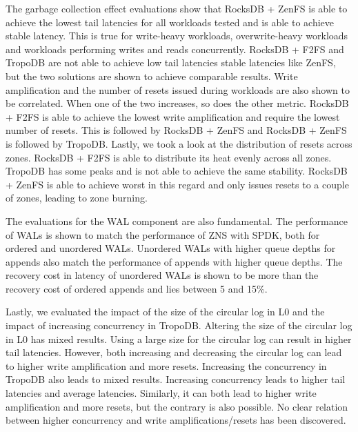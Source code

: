 The garbage collection effect evaluations show that RocksDB + ZenFS is able to achieve the lowest tail latencies for all workloads tested and is able to achieve stable latency. This is true for write-heavy workloads, overwrite-heavy workloads and workloads performing writes and reads concurrently. RocksDB + F2FS and TropoDB are not able to achieve low tail latencies stable latencies like ZenFS, but the two solutions are shown to achieve comparable results. Write amplification and the number of resets issued during workloads are also shown to be correlated. When one of the two increases, so does the other metric. RocksDB + F2FS is able to achieve the lowest write amplification and require the lowest number of resets. This is followed by RocksDB + ZenFS and RocksDB + ZenFS is followed by TropoDB. Lastly, we took a look at the distribution of resets across zones. RocksDB + F2FS is able to distribute its heat evenly across all zones. TropoDB has some peaks and is not able to achieve the same stability. RocksDB + ZenFS is able to achieve worst in this regard and only issues resets to a couple of zones, leading to zone burning.

The evaluations for the WAL component are also fundamental. The performance of WALs is shown to match the performance of ZNS with SPDK, both for ordered and unordered WALs. Unordered WALs with higher queue depths for appends also match the performance of appends with higher queue depths. The recovery cost in latency of unordered WALs is shown to be more than the recovery cost of ordered appends and lies between 5 and 15\%.  

Lastly, we evaluated the impact of the size of the circular log in L0 and the impact of increasing concurrency in TropoDB. Altering the size of the circular log in L0 has mixed results. Using a large size for the circular log can result in higher tail latencies. However, both increasing and decreasing the circular log can lead to higher write amplification and more resets. Increasing the concurrency in TropoDB also leads to mixed results. Increasing concurrency leads to higher tail latencies and average latencies. Similarly, it can both lead to higher write amplification and more resets, but the contrary is also possible. No clear relation between higher concurrency and write amplifications/resets has been discovered. 
